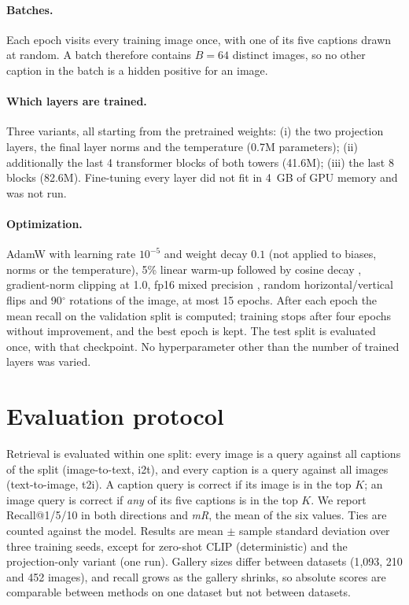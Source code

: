 \documentclass[11pt,a4paper]{article}
\begin{document}
\paragraph{Batches.} Each epoch visits every training image once, with one of its five captions drawn at random. A batch therefore contains $B=64$ distinct images, so no other caption in the batch is a hidden positive for an image.
\paragraph{Which layers are trained.} Three variants, all starting from the pretrained weights: (i) the two projection layers, the final layer norms and the temperature (0.7M parameters); (ii) additionally the last 4 transformer blocks of both towers (41.6M); (iii) the last 8 blocks (82.6M). Fine-tuning every layer did not fit in 4~GB of GPU memory and was not run.
\paragraph{Optimization.} AdamW \citep{loshchilov2019adamw} with learning rate $10^{-5}$ and weight decay $0.1$ (not applied to biases, norms or the temperature), 5\% linear warm-up followed by cosine decay \citep{loshchilov2017sgdr}, gradient-norm clipping at 1.0, fp16 mixed precision \citep{micikevicius2018mixed}, random horizontal/vertical flips and 90$^\circ$ rotations of the image, at most 15 epochs. After each epoch the mean recall on the validation split is computed; training stops after four epochs without improvement, and the best epoch is kept. The test split is evaluated once, with that checkpoint. No hyperparameter other than the number of trained layers was varied.

\section{Evaluation protocol}
Retrieval is evaluated within one split: every image is a query against all captions of the split (image-to-text, i2t), and every caption is a query against all images (text-to-image, t2i). A caption query is correct if its image is in the top $K$; an image query is correct if \emph{any} of its five captions is in the top $K$. We report Recall@1/5/10 in both directions and \emph{mR}, the mean of the six values. Ties are counted against the model. Results are mean $\pm$ sample standard deviation over three training seeds, except for zero-shot CLIP (deterministic) and the projection-only variant (one run). Gallery sizes differ between datasets (1{,}093, 210 and 452 images), and recall grows as the gallery shrinks, so absolute scores are comparable between methods on one dataset but not between datasets.
\end{document}
